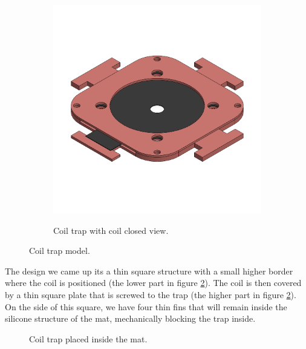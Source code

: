 \begin{figure}
\begin{subfigure}[b]{0.475\textwidth}
{            \includegraphics{Chapters/Chapter5/Flexible_Mat_Prototypes/Figures/coil_trap_closed.png}
        }
        \caption{Coil trap with coil closed view.}
        \label{fig: coil_trap_closed}
    \end{subfigure}
    \caption{Coil trap model.}
    \label{fig: mat_mold_core_trap}
\end{figure}
The design we came up its a thin square structure with a small higher border where the coil is positioned (the lower part in figure \ref{fig: mat_mold_core_trap}).
The coil is then covered by a thin square plate that is screwed to the trap (the higher part in figure \ref{fig: mat_mold_core_trap}).
On the side of this square, we have four thin fins that will remain inside the silicone structure of the mat, mechanically blocking the trap inside.
\begin{figure}
    \centering
    \caption{Coil trap placed inside the mat.}
    \label{fig: coil_trap_in_mat}
\end{figure}
